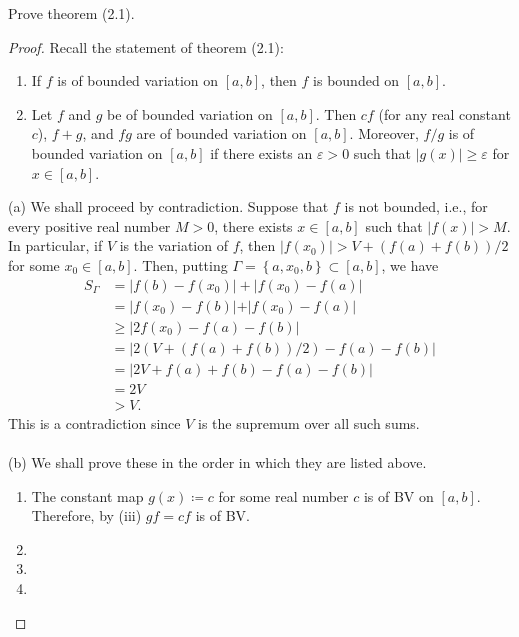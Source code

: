 \begin{problem}
Prove theorem (2.1).
\end{problem}
\begin{proof}
Recall the statement of theorem (2.1):
\begin{theorem*}
\begin{enumerate}[label=(\alph*)]
\item If $f$ is of bounded variation on $[a,b]$, then $f$ is bounded on
  $[a,b]$.
\item Let $f$ and $g$ be of bounded variation on $[a,b]$. Then $cf$ (for
  any real constant $c$), $f+g$, and $fg$ are of bounded variation on
  $[a,b]$. Moreover, $f/g$ is of bounded variation on $[a,b]$ if there
  exists an $\varepsilon>0$ such that $|g(x)|\geq\varepsilon$ for
  $x\in[a,b]$.
\end{enumerate}
\end{theorem*}
\bigskip

(a) We shall proceed by contradiction. Suppose that $f$ is not bounded,
i.e., for every positive real number $M>0$, there exists $x\in[a,b]$ such
that $|f(x)|>M$. In particular, if $V$ is the variation of $f$, then
$|f(x_0)|>V+(f(a)+f(b))/2$ for some $x_0\in[a,b]$. Then, putting
$\Gamma=\left\{a,x_0,b\right\}\subset[a,b]$, we have
\begin{align*}
S_\Gamma&=\left|f(b)-f(x_0)\right|+\left|f(x_0)-f(a)\right|\\
&=\left|f(x_0)-f(b)|+|f(x_0)-f(a)\right|\\
&\geq\left|2f(x_0)-f(a)-f(b)\right|\\
&=\left|2\left(V+(f(a)+f(b))/2\right)-f(a)-f(b)\right|\\
&=\left|2V+f(a)+f(b)-f(a)-f(b)\right|\\
&=2V\\
&>V.
\end{align*}
This is a contradiction since $V$ is the supremum over all such sums.
\\\\
(b) We shall prove these in the order in which they are listed above.
\begin{enumerate}[label=(\roman*)]
\item The constant map $g(x)\coloneqq c$ for some real number $c$ is of BV
  on $[a,b]$. Therefore, by (iii) $gf=cf$ is of BV.
\item
\item
\item
\end{enumerate}
\end{proof}
\newpage

